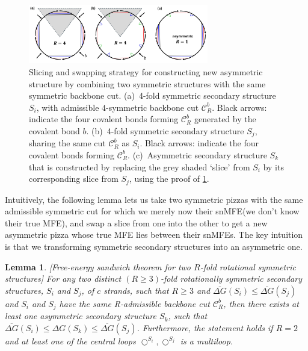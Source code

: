 \documentclass[11pt,letterpaper]{article}  \usepackage[margin=1in]{geometry}
\newtheorem{lemma}[theorem]{Lemma}
\theoremstyle{definition}  \newtheorem{Definition}[theorem]{Definition}
\newcommand{\snMFE}{snMFE\xspace}
\newcommand{\DGnosym}{\ensuremath{\overline{\Delta G}}}
\begin{document}
\begin{figure}[t]
	\centering\includegraphics[width=0.7\textwidth]{figures/sand.jpg}
	\caption{Slicing and swapping strategy for constructing new asymmetric structure by combining two symmetric structures with the same symmetric backbone cut. 
		(a)~4-fold symmetric secondary structure $S_i$, with admissible $4$-symmetric backbone cut $\mathcal{C}_R^b$.
		Black arrows: indicate the four covalent bonds forming $\mathcal{C}_R^b$ generated by the covalent bond $b$. 
		(b)~4-fold symmetric secondary structure $S_j$, sharing the same cut $\mathcal{C}_R^b$ as $S_i$.
		Black arrows: indicate the four covalent bonds forming $\mathcal{C}_R^b$. 
		(c)~Asymmetric secondary structure $S_k$ that is constructed by replacing the grey shaded `slice' from $S_i$ by its corresponding slice from $S_j$, using the proof of  \cref{lem:sand}. 
	}\label{fig:sand}
\end{figure}



Intuitively, the following lemma lets us take two symmetric pizzas with the same admissible symmetric cut for which we merely now their \snMFE (we don't know their true MFE), and swap a slice from one into the other to get a new asymmetric pizza whose true MFE lies between their {\snMFE}s. The key intuition is that we transforming symmetric secondary structures into an  asymmetric one. 

\begin{lemma}\label{lem:sand}[Free-energy sandwich theorem for two $R$-fold rotational symmetric  structures]
	For any two distinct $(R \geq 3)$-fold rotationally symmetric secondary structures, $S_i$ and $S_j$, of $c$ strands, such that $R \geq 3$ and $\DGnosym(S_i) \leq \DGnosym(S_j)$ and $S_i$ and $S_j$ have the same R-admissible backbone cut $\mathcal{C}_R^b$, then there exists at least one asymmetric secondary structure $S_k$, such that $\DGnosym(S_i) \leq \Delta G(S_k) \leq \DGnosym(S_j)$.  Furthermore, the statement holds if $R=2$ and at least one of the central loops  $\bigcirc^{S_i},  \bigcirc^{S_j}$  is a multiloop. 
\end{lemma}
\end{document}

